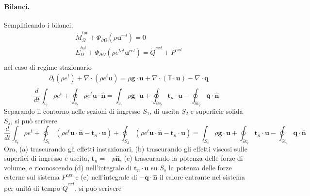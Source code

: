 \paragraph{Bilanci.} Semplificando i bilanci,
\begin{equation}
\begin{aligned}
    & \dot{M}_{\Omega}^{tot} + \Phi_{\partial \Omega}(\rho \mathbf{u}^{rel}) = 0 \\
    & \dot{E}_{\Omega}^{tot} + \Phi_{\partial \Omega}(\rho e^{tot} \mathbf{u}^{rel}) = \dot{Q}^{ext} + P^{ext} \\
\end{aligned}
\end{equation}
nel caso di regime stazionario
\begin{equation}
\begin{aligned}
    & \partial_t ( \rho e^t ) + \nabla \cdot ( \rho e^t \mathbf{u} ) = \rho \mathbf{g} \cdot \mathbf{u} + \nabla \cdot (\mathbb{T} \cdot \mathbf{u}) - \nabla \cdot \mathbf{q} \\
\end{aligned}
\end{equation}
\begin{equation}
    \dfrac{d}{dt} \int_{v_t} \rho e^t + \oint_{v_t} \rho e^t \mathbf{u} \cdot \mathbf{\hat{n}} = \int_{v_t} \rho \mathbf{g} \cdot \mathbf{u} + \oint_{\partial v_t} \mathbf{t}_n \cdot \mathbf{u} - \oint_{\partial v_t} \mathbf{q} \cdot \mathbf{\hat{n}}
\end{equation}
Separando il contorno nelle sezioni di ingresso $S_1$, di uscita $S_2$ e superficie solida $S_s$, si può scrivere
\begin{equation}
    \dfrac{d}{dt} \int_{v_t} \rho e^t + \oint_{S_1} \left( \rho e^t \mathbf{u} \cdot \mathbf{\hat{n}} - \mathbf{t}_n \cdot \mathbf{u} \right) + \oint_{S_2} \left( \rho e^t \mathbf{u} \cdot \mathbf{\hat{n}} - \mathbf{t}_n \cdot \mathbf{u} \right)  = \int_{S_s} \rho \mathbf{g} \cdot \mathbf{u} + \oint_{\partial v_t} \mathbf{t}_n \cdot \mathbf{u} - \oint_{\partial v_t} \mathbf{q} \cdot \mathbf{\hat{n}}
\end{equation}
Ora, (a) trascurando gli effetti instazionari, (b) trascurando gli effetti viscosi sulle superfici di ingresso e uscita, $\mathbf{t}_n = - p \mathbf{\hat{n}}$, (c) trascurando la potenza delle forze di volume, e riconoscendo (d) nell'integrale di $\mathbf{t}_n \cdot \mathbf{u}$ su $S_s$ la potenza delle forze esterne sul sistema $P^{ext}$ e (e) nell'integrale di $-\mathbf{q} \cdot \mathbf{\hat{n}}$ il calore entrante nel sistema per unità di tempo $\dot{Q}^{ext}$, si può scrivere
